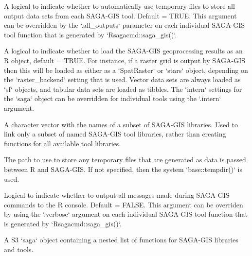 \documentclass[a4paper]{book}
\begin{document}
\begin{Arguments}
\begin{ldescription}
\item[\code{all\_outputs}] A logical to indicate whether to automatically use
temporary files to store all output data sets from each SAGA-GIS tool.
Default = TRUE. This argument can be overridden by the `.all\_outputs`
parameter on each individual SAGA-GIS tool function that is generated by
`Rsagacmd::saga\_gis()`.

\item[\code{intern}] A logical to indicate whether to load the SAGA-GIS
geoprocessing results as an R object, default = TRUE. For instance, if a
raster grid is output by SAGA-GIS then this will be loaded as either as
a `SpatRaster` or `stars` object, depending on the `raster\_backend`
setting that is used. Vector data sets are always loaded as `sf` objects,
and tabular data sets are loaded as tibbles. The `intern` settings for the
`saga` object can be overridden for individual tools using the `.intern`
argument.

\item[\code{opt\_lib}] A character vector with the names of a subset of SAGA-GIS
libraries. Used to link only a subset of named SAGA-GIS tool libraries,
rather than creating functions for all available tool libraries.

\item[\code{temp\_path}] The path to use to store any temporary files that are
generated as data is passed between R and SAGA-GIS. If not specified, then
the system `base::tempdir()` is used.

\item[\code{verbose}] Logical to indicate whether to output all messages made during
SAGA-GIS commands to the R console. Default = FALSE. This argument can be
overriden by using the `.verbose` argument on each individual SAGA-GIS tool
function that is generated by `Rsagacmd::saga\_gis()`.
\end{ldescription}
\end{Arguments}
%
\begin{Value}
A S3 `saga` object containing a nested list of functions for SAGA-GIS
libraries and tools.
\end{Value}
%
\end{document}

